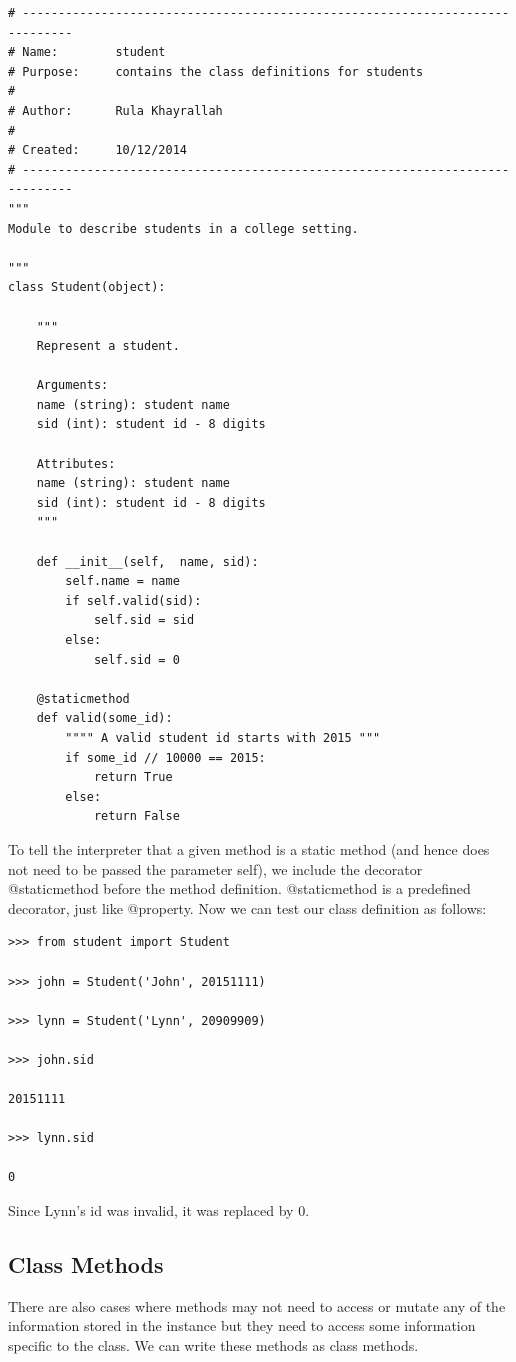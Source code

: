 \documentclass{article}
\begin{document}
\begin{lstlisting}
# -----------------------------------------------------------------------------
# Name:        student
# Purpose:     contains the class definitions for students
#
# Author:      Rula Khayrallah
#
# Created:     10/12/2014
# -----------------------------------------------------------------------------
"""
Module to describe students in a college setting.
 
"""
class Student(object):
 
    """
    Represent a student.
 
    Arguments:
    name (string): student name
    sid (int): student id - 8 digits
 
    Attributes:
    name (string): student name
    sid (int): student id - 8 digits
    """
 
    def __init__(self,  name, sid):
        self.name = name
        if self.valid(sid):
            self.sid = sid
        else:
            self.sid = 0
 
    @staticmethod
    def valid(some_id):
        """" A valid student id starts with 2015 """
        if some_id // 10000 == 2015:
            return True
        else:
            return False
\end{lstlisting}
 
To tell the interpreter that a given method is a static method (and hence does not need to be passed the parameter self), we include the decorator @staticmethod before the method definition.  @staticmethod is a predefined decorator, just like @property.
Now we can test our class definition as follows:

\begin{lstlisting}
>>> from student import Student

>>> john = Student('John', 20151111)

>>> lynn = Student('Lynn', 20909909)

>>> john.sid

20151111

>>> lynn.sid

0 
\end{lstlisting}

Since Lynn's id was invalid, it was replaced by 0.

\subsection{Class Methods}

There are also cases where methods may not need to access or mutate any of the information stored in the instance but they need to access some information specific to the class.  We can write these methods as class methods.
\end{document}
